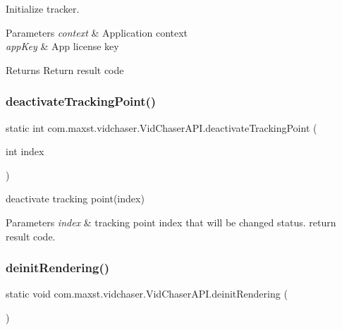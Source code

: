 Initialize tracker.


\begin{DoxyParams}{Parameters}
{\em context} & Application context \\
\hline
{\em app\+Key} & App license key \\
\hline
\end{DoxyParams}
\begin{DoxyReturn}{Returns}
Return result code 
\end{DoxyReturn}
\mbox{\label{classcom_1_1maxst_1_1vidchaser_1_1_vid_chaser_a_p_i_a36952cb46625a4a4ee0fa7183fbf03b1}} 
\subsubsection{\texorpdfstring{deactivate\+Tracking\+Point()}{deactivateTrackingPoint()}}
{\footnotesize\ttfamily static int com.\+maxst.\+vidchaser.\+Vid\+Chaser\+A\+P\+I.\+deactivate\+Tracking\+Point (\begin{DoxyParamCaption}\item[{int}]{index }\end{DoxyParamCaption})\hspace{0.3cm}{\ttfamily [static]}}



deactivate tracking point(index) 


\begin{DoxyParams}{Parameters}
{\em index} & tracking point index that will be changed status. return result code. \\
\hline
\end{DoxyParams}
\mbox{\label{classcom_1_1maxst_1_1vidchaser_1_1_vid_chaser_a_p_i_ab9d7cb7188771fac801aa2e9aefc6a83}} 
\subsubsection{\texorpdfstring{deinit\+Rendering()}{deinitRendering()}}
{\footnotesize\ttfamily static void com.\+maxst.\+vidchaser.\+Vid\+Chaser\+A\+P\+I.\+deinit\+Rendering (\begin{DoxyParamCaption}{ }\end{DoxyParamCaption})\hspace{0.3cm}{\ttfamily [static]}}

